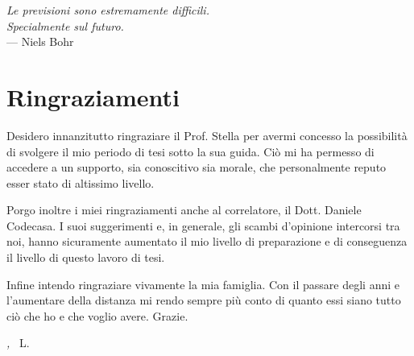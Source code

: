 
\cleardoublepage
{}
{}

\begin{flushright}{\slshape
	Le previsioni sono estremamente difficili. \\
	Specialmente sul futuro.} \\\medskip
    --- Niels Bohr
\end{flushright}

\bigskip

\begingroup
\let\clearpage\relax
\let\cleardoublepage\relax
\let\cleardoublepage\relax

\chapter*{Ringraziamenti}

Desidero innanzitutto ringraziare il Prof. Stella per avermi concesso la possibilità di svolgere il mio periodo di tesi sotto la sua guida. Ciò mi ha permesso di accedere a un supporto, sia conoscitivo sia morale, che personalmente reputo esser stato di altissimo livello.

Porgo inoltre i miei ringraziamenti anche al correlatore, il Dott. Daniele Codecasa. I suoi suggerimenti e, in generale, gli scambi d'opinione intercorsi tra noi, hanno sicuramente aumentato il mio livello di preparazione e di conseguenza il livello di questo lavoro di tesi.

Infine intendo ringraziare vivamente la mia famiglia. Con il passare degli anni e l'aumentare della distanza mi rendo sempre più conto di quanto essi siano tutto ciò che ho e che voglio avere. Grazie.

\bigskip

\noindent\textit{\mylocation, \MakeTextLowercase{\mytime}}
\hfill ~L.

\endgroup
